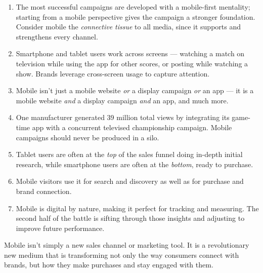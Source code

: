 \begin{enumerate}
\item {} The most successful campaigns are developed
      with a mobile-first mentality; starting from a mobile perspective gives the
      campaign a stronger foundation. Consider mobile the \emph{connective tissue}
      to all media, since it supports and strengthens every channel.
\item {} Smartphone and tablet users work
      across screens --- watching a match on television while using the app for
      other scores, or posting while watching a show. Brands leverage cross-screen
      usage to capture attention.
\item {} Mobile
      isn't just a mobile website \emph{or} a display campaign \emph{or} an app
      --- it is a mobile website \emph{and} a display campaign \emph{and} an app,
      and much more.
\item {} One
      manufacturer generated 39 million total views by integrating its game-time
      app with a concurrent televised championship campaign. Mobile campaigns
      should never be produced in a silo.
\item {} Tablet users are
      often at the \emph{top} of the sales funnel doing in-depth initial research,
      while smartphone users are often at the \emph{bottom}, ready to purchase.
\item {} Mobile visitors use it for
      search and discovery as well as for purchase and brand connection.
\item {} Mobile is digital by nature, making it
      perfect for tracking and measuring. The second half of the battle is sifting
      through those insights and adjusting to improve future performance.
\end{enumerate}

\begin{keybox}
Mobile isn't simply a new sales channel or marketing tool. It is a revolutionary
new medium that is transforming not only the way consumers connect with brands,
but how they make purchases and stay engaged with them.
\end{keybox}

